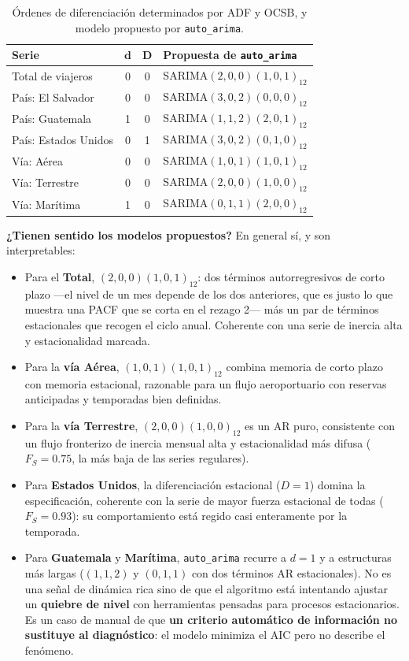 \documentclass[12pt,letterpaper]{article}
\begin{document}
\begin{table}[H]
\centering
\small
\begin{tabular}{lccl}
\toprule
\textbf{Serie} & $\boldsymbol{d}$ & $\boldsymbol{D}$ & \textbf{Propuesta de \texttt{auto\_arima}} \\
\midrule
Total de viajeros      & 0 & 0 & SARIMA$(2,0,0)(1,0,1)_{12}$ \\
País: El Salvador      & 0 & 0 & SARIMA$(3,0,2)(0,0,0)_{12}$ \\
País: Guatemala        & 1 & 0 & SARIMA$(1,1,2)(2,0,1)_{12}$ \\
País: Estados Unidos   & 0 & 1 & SARIMA$(3,0,2)(0,1,0)_{12}$ \\
Vía: Aérea             & 0 & 0 & SARIMA$(1,0,1)(1,0,1)_{12}$ \\
Vía: Terrestre         & 0 & 0 & SARIMA$(2,0,0)(1,0,0)_{12}$ \\
Vía: Marítima          & 1 & 0 & SARIMA$(0,1,1)(2,0,0)_{12}$ \\
\bottomrule
\end{tabular}
\caption{Órdenes de diferenciación determinados por ADF y OCSB, y modelo propuesto por
\texttt{auto\_arima}.}
\end{table}

\textbf{¿Tienen sentido los modelos propuestos?} En general sí, y son interpretables:

\begin{itemize}[leftmargin=1.4em,itemsep=3pt]
  \item Para el \textbf{Total}, $(2,0,0)(1,0,1)_{12}$: dos términos autorregresivos de corto
  plazo ---el nivel de un mes depende de los dos anteriores, que es justo lo que muestra una
  PACF que se corta en el rezago 2--- más un par de términos estacionales que recogen el ciclo
  anual. Coherente con una serie de inercia alta y estacionalidad marcada.
  \item Para la \textbf{vía Aérea}, $(1,0,1)(1,0,1)_{12}$ combina memoria de corto plazo con
  memoria estacional, razonable para un flujo aeroportuario con reservas anticipadas y
  temporadas bien definidas.
  \item Para la \textbf{vía Terrestre}, $(2,0,0)(1,0,0)_{12}$ es un AR puro, consistente con un
  flujo fronterizo de inercia mensual alta y estacionalidad más difusa ($F_S = 0.75$, la más
  baja de las series regulares).
  \item Para \textbf{Estados Unidos}, la diferenciación estacional ($D=1$) domina la
  especificación, coherente con la serie de mayor fuerza estacional de todas ($F_S = 0.93$):
  su comportamiento está regido casi enteramente por la temporada.
  \item Para \textbf{Guatemala} y \textbf{Marítima}, \texttt{auto\_arima} recurre a $d=1$ y a
  estructuras más largas ($(1,1,2)$ y $(0,1,1)$ con dos términos AR estacionales). No es una
  señal de dinámica rica sino de que el algoritmo está intentando ajustar un \textbf{quiebre de
  nivel} con herramientas pensadas para procesos estacionarios. Es un caso de manual de que
  \textbf{un criterio automático de información no sustituye al diagnóstico}: el modelo minimiza
  el AIC pero no describe el fenómeno.
\end{itemize}
\end{document}
